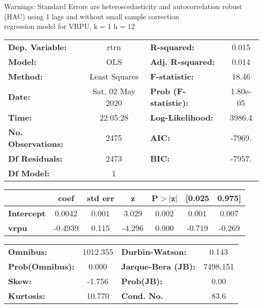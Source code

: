 Warnings: \newline
 [1] Standard Errors are heteroscedasticity and autocorrelation robust (HAC) using 1 lags and without small sample correction\\ 

regression model for VRPU, k = 1 h = 12\begin{center}
\begin{tabular}{lclc}
\toprule
\textbf{Dep. Variable:}    &       rtrn       & \textbf{  R-squared:         } &     0.015   \\
\textbf{Model:}            &       OLS        & \textbf{  Adj. R-squared:    } &     0.014   \\
\textbf{Method:}           &  Least Squares   & \textbf{  F-statistic:       } &     18.46   \\
\textbf{Date:}             & Sat, 02 May 2020 & \textbf{  Prob (F-statistic):} &  1.80e-05   \\
\textbf{Time:}             &     22:05:28     & \textbf{  Log-Likelihood:    } &    3986.4   \\
\textbf{No. Observations:} &        2475      & \textbf{  AIC:               } &    -7969.   \\
\textbf{Df Residuals:}     &        2473      & \textbf{  BIC:               } &    -7957.   \\
\textbf{Df Model:}         &           1      & \textbf{                     } &             \\
\bottomrule
\end{tabular}
\begin{tabular}{lcccccc}
                   & \textbf{coef} & \textbf{std err} & \textbf{z} & \textbf{P$> |$z$|$} & \textbf{[0.025} & \textbf{0.975]}  \\
\midrule
\textbf{Intercept} &       0.0042  &        0.001     &     3.029  &         0.002        &        0.001    &        0.007     \\
\textbf{vrpu}      &      -0.4939  &        0.115     &    -4.296  &         0.000        &       -0.719    &       -0.269     \\
\bottomrule
\end{tabular}
\begin{tabular}{lclc}
\textbf{Omnibus:}       & 1012.355 & \textbf{  Durbin-Watson:     } &    0.143  \\
\textbf{Prob(Omnibus):} &   0.000  & \textbf{  Jarque-Bera (JB):  } & 7498.151  \\
\textbf{Skew:}          &  -1.756  & \textbf{  Prob(JB):          } &     0.00  \\
\textbf{Kurtosis:}      &  10.770  & \textbf{  Cond. No.          } &     83.6  \\
\bottomrule
\end{tabular}
\end{center}

